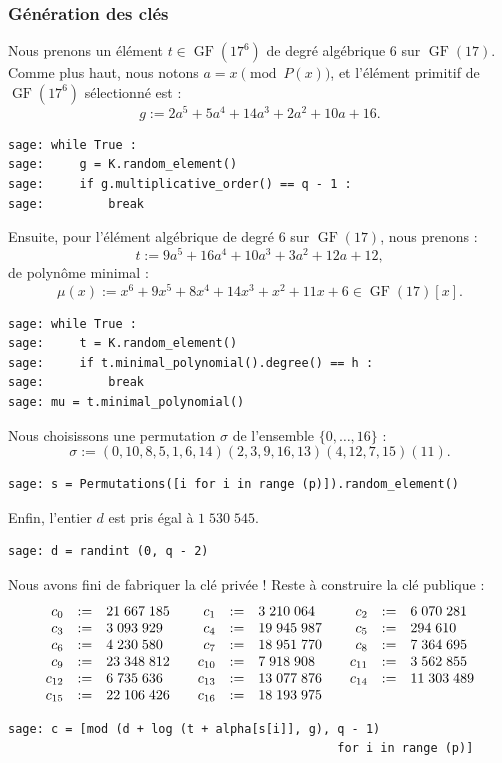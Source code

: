 \documentclass[a4paper, titlepage, 11pt]{article}
\theoremstyle{definition}
\theoremstyle{remark}
\def\gf{\operatorname{GF}}
\begin{document}
\subsubsection{Génération des clés}
Nous prenons un élément $t\in\gf(17^6)$ de degré algébrique $6$ sur $\gf(17)$. Comme plus haut, nous notons $a = x \pmod{P(x)}$, et l'élément primitif de $\gf(17^6)$ sélectionné est :
$$g := 2a^5 + 5a^4 + 14a^3 + 2a^2 + 10a + 16.$$
\begin{verbatim}    
sage: while True :
sage:     g = K.random_element()
sage:     if g.multiplicative_order() == q - 1 :
sage:         break
\end{verbatim}
Ensuite, pour l'élément algébrique de degré $6$ sur $\gf(17)$, nous prenons :
$$t := 9a^5 + 16a^4 + 10a^3 + 3a^2 + 12a + 12,$$
de polynôme minimal :
$$\mu(x) := x^6 + 9x^5 + 8x^4 + 14x^3 + x^2 + 11x + 6\in\gf(17)[x].$$
\begin{verbatim}    
sage: while True :
sage:     t = K.random_element()
sage:     if t.minimal_polynomial().degree() == h :
sage:         break
sage: mu = t.minimal_polynomial()
\end{verbatim}
Nous choisissons une permutation $\sigma$ de l'ensemble $\{0, \dots, 16\}$ :
$$\sigma := (0,10,8,5,1,6,14)(2,3,9,16,13)(4,12,7,15)(11).$$
\begin{verbatim}
sage: s = Permutations([i for i in range (p)]).random_element()
\end{verbatim}
Enfin, l'entier $d$ est pris égal à $1\;530\;545$.
\begin{verbatim}
sage: d = randint (0, q - 2)
\end{verbatim}
Nous avons fini de fabriquer la clé privée ! Reste à construire la clé publique :
$$\begin{array}{r c l c r c l c r c l}
c_0 &:=& 21\;667\;185 &&
c_1 &:=& 3\;210\;064 &&
c_2 &:=& 6\;070\;281 \\
c_3 &:=& 3\;093\;929 &&
c_4 &:=& 19\;945\;987 &&
c_5 &:=& 294\;610 \\
c_6 &:=& 4\;230\;580 &&
c_7 &:=& 18\;951\;770 &&
c_8 &:=& 7\;364\;695 \\
c_9 &:=& 23\;348\;812 &&
c_{10} &:=& 7\;918\;908 &&
c_{11} &:=& 3\;562\;855 \\
c_{12} &:=& 6\;735\;636 &&
c_{13} &:=& 13\;077\;876 &&
c_{14} &:=& 11\;303\;489 \\
c_{15} &:=& 22\;106\;426 &&
c_{16} &:=& 18\;193\;975 
\end{array}$$
\begin{verbatim}
sage: c = [mod (d + log (t + alpha[s[i]], g), q - 1) 
                                              for i in range (p)]
\end{verbatim}
\end{document}
